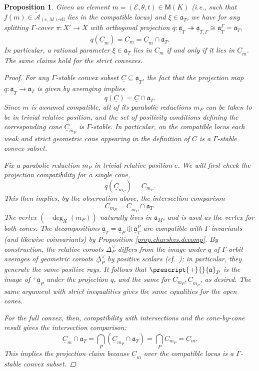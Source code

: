 \documentclass[openany]{amsbook}
\newtheorem{proposition}[theorem]{Proposition}
\theoremstyle{definition}
\theoremstyle{remark}
\numberwithin{equation}{section}
\newcommand{\cA}{\mathcal{A}}
\newcommand{\cE}{\mathcal{E}}
\newcommand{\ul}[1]{\underline{#1}}
\renewcommand{\-}{\operatorname{-}}
\renewcommand{\a}{\mathfrak{a}}
\newcommand{\el}{\text{-ell}}
\newcommand{\ctA}{\widetilde{\cA}}
\newcommand{\ctAe}[2]{\ctA_{(#1, #2)\el}}
\newcommand{\bM}{\mathsf{M}}
\newcommand{\obtcone}{\prescript{+}{}{\a}}
\newcommand{\ga}{\ul{\a}}
\newcommand{\gobtcone}{{}^+ \ul{\a}}
\begin{document}
\begin{proposition}\label{prop.rat.geo.convex.compat}
    Given an element $m = (\cE, \theta, t) \in \bM(K)$ (i.e., such that $f(m) \in \ctAe{e}{M}$ lies in the \textit{compatible} locus) and $\xi \in \a_T$, we have for any splitting $\Gamma$-cover $\pi : X' \to X$ with orthogonal projection $q : \ga_T \twoheadrightarrow \ga_{T, \Gamma} \cong \ga_T^\Gamma = \a_T$, 
    $$
        q(\ul{C}_m) = C_m = \ul{C}_m \cap \a_T.
    $$
    In particular, a rational parameter $\xi \in \a_T$ lies in $C_m$ if and only if it lies in $\ul{C}_m$. The same claims hold for the strict convexes.
    \begin{proof} 
        For any $\Gamma$-stable convex subset $\ul{C} \subseteq \ga_T$, the fact that the projection map $q : \ga_T \to \a_T$ is given by averaging implies
        $$
            q(\ul{C}) = \ul{C} \cap \a_T.
        $$
        Since $m$ is assumed compatible, all of its parabolic reductions $m_P$ can be taken to be in trivial relative position, and the set of positivity conditions defining the corresponding cone $\ul{C}_{m_P}$ is $\Gamma$-stable. In particular, on the compatible locus each weak and strict geometric cone appearing in the definition of $\ul{C}$ is a $\Gamma$-stable convex subset. 
        
        Fix a parabolic reduction $m_P$ in trivial relative position $e$. We will first check the projection compatibility for a single cone,
        $$
            q(\ul{C}_{m_P}) = C_{m_P}. 
        $$
        This then implies, by the observation above, the intersection comparison
        $$
            C_{m_P} = \ul{C}_{m_P} \cap \a_T.
        $$
        The vertex $(-\deg_{X}(m_P))$ naturally lives in $\a_M$, and is used as the vertex for both cones. The decompositions $\ga_T = \ga_P \oplus \ga_T^P$ are compatible with $\Gamma$-invariants (and likewise coinvariants) by Proposition \ref{prop.charshvs.decomp}.         By construction, the relative coroots $\Delta_P^\vee$ differs from the image under $q$ of $\Gamma$-orbit averages of geometric coroots $\ul{\Delta}_P^\vee$ by positive scalars (cf.\ \cite[\S 2.6]{KPBruhatTits}); in particular, they generate the same positive rays. It follows that $\obtcone_P$ is the image of $\gobtcone_P$ under the projection $q$, and the same for $C_{m_P}, \ul{C}_{m_P}$, as desired. The same argument with strict inequalities gives the same equalities for the open cones.
        
                                                        
        For the full convex, then, compatibility with intersections and the cone-by-cone result gives the intersection comparison:
        $$
            \ul{C}_m \cap \a_T = \bigcap_P (\ul{C}_{m_P} \cap \a_T) = \bigcap_P C_{m_P} = C_m.
        $$
        This implies the projection claim because $\ul{C}_m$ over the compatible locus is a $\Gamma$-stable convex subset.
    \end{proof}
\end{proposition}
\end{document}
